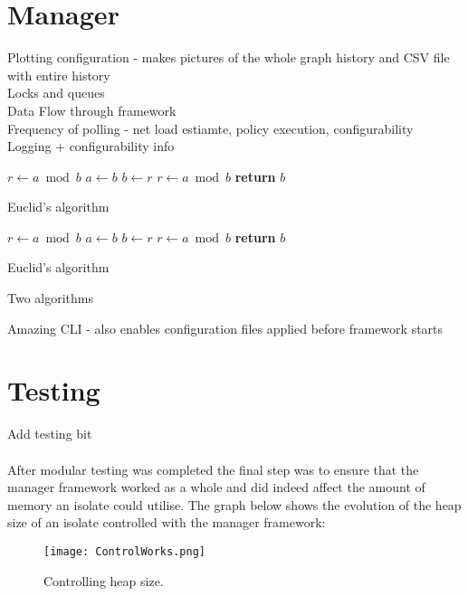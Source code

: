 \documentclass{l4proj}
\begin{document}
\section{Manager}
Plotting configuration - makes pictures of the whole graph history and CSV file with entire history
\\Locks and queues
\\Data Flow through framework
\\Frequency of polling - net load estiamte, policy execution, configurability
\\Logging + configurability
info
\begin{table}[H]%
\begin{subalgorithm}{.5\textwidth}
\begin{algorithmic}[1]
    \State $r\gets a\bmod b$
      \State $a\gets b$
      \State $b\gets r$
      \State $r\gets a\bmod b$
    \EndWhile
    \State \textbf{return} $b$
  \EndProcedure
\end{algorithmic}
\caption{Euclid’s algorithm}\label{algo1}
\end{subalgorithm}%
\begin{subalgorithm}{.5\textwidth}
\begin{algorithmic}[1]
    \State $r\gets a\bmod b$
      \State $a\gets b$
      \State $b\gets r$
      \State $r\gets a\bmod b$
    \EndWhile
    \State \textbf{return} $b$
  \EndProcedure
\end{algorithmic}
\caption{Euclid’s algorithm}\label{algo2}
\end{subalgorithm}
\captionsetup{labelformat=alglabel}
\caption{Two algorithms}%
\label{tab:1}%
\end{table}
Amazing CLI - also enables configuration files applied before framework starts
\section{Testing}
Add testing bit
\\\\
\hspace*{3em} After modular testing was completed the final step was to ensure that the manager framework worked as a whole and did indeed affect the amount of memory an isolate could utilise. The graph below shows the evolution of the heap size of an isolate controlled with the manager framework:
\begin{figure}[!ht]
  \centering
    \texttt{[image: ControlWorks.png]}
	\caption{Controlling heap size.}
\end{figure}
\end{document}
